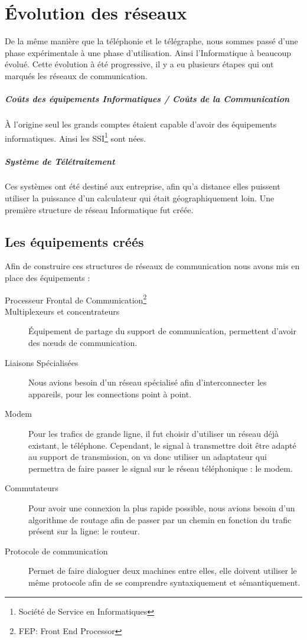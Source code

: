 \chapter{\'Evolution des réseaux}
		De la même manière que la téléphonie et le télégraphe, nous sommes passé d'une phase expérimentale à une phase d'utilisation. Ainsi l'Informatique à beaucoup évolué. Cette évolution à été progressive, il y a eu plusieurs étapes qui ont marqués les réseaux de communication.
		\paragraph{Coûts des équipements Informatiques / Coûts de la Communication} À l'origine seul les grands comptes étaient capable d'avoir des équipements informatiques. Ainsi les SSI\footnote{Société de Service en Informatiques} sont nées.
		\paragraph{Système de Télétraitement} Ces systèmes ont été destiné aux entreprise, afin qu'a distance elles puissent utiliser la puissance d'un calculateur qui était géographiquement loin. Une première structure de réseau Informatique fut créée.

		\section{Les équipements créés}
		Afin de construire ces structures de réseaux de communication nous avons mis en place des équipements :
		\begin{description}
			\item[Processeur Frontal de Communication\footnote{FEP: Front End Processor}]
			\item[Multiplexeurs et concentrateurs] Équipement de partage du support de communication, permettent d'avoir des nœuds de communication.
			\item[Liaisons Spécialisées] Nous avions besoin d'un réseau spécialisé afin d'interconnecter les appareils, pour les connections point à point.
			\item[Modem] Pour les trafics de grande ligne, il fut choisir d'utiliser un réseau déjà existant, le téléphone.
		Cependant, le signal à transmettre doit être adapté au support de transmission, on va donc utiliser un adaptateur qui permettra de faire 
		passer le signal sur le réseau téléphonique : le modem.
			\item[Commutateurs] Pour avoir une connexion la plus rapide possible, nous avions besoin d'un algorithme de routage afin de passer par un chemin en fonction du trafic présent sur la ligne: le routeur.
			\item[Protocole de communication] Permet de faire dialoguer deux machines entre elles, elle doivent utiliser le même protocole afin de se comprendre syntaxiquement et sémantiquement.
		\end{description}
		
